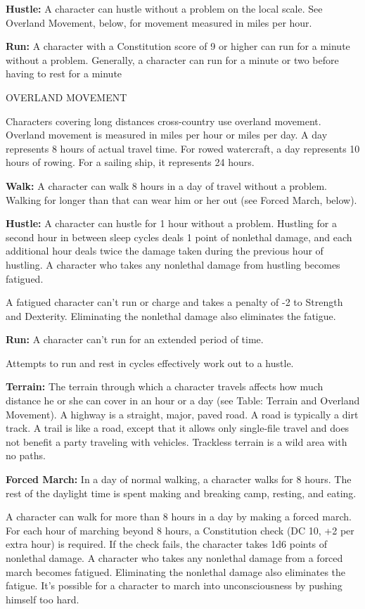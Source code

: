 \documentclass{article}
\begin{document}
\textbf{Hustle: }A character can hustle without a problem on the local scale. See 
Overland Movement, below, for movement measured in miles per hour.

\textbf{Run:} A character with a Constitution score of 9 or higher can run for 
a minute without a problem. Generally, a character can run for a minute or two 
before having to rest for a minute

\vspace{12pt}
OVERLAND MOVEMENT

Characters covering long distances cross-country use overland movement. Overland 
movement is measured in miles per hour or miles per day. A day represents 8 hours 
of actual travel time. For rowed watercraft, a day represents 10 hours of rowing. 
For a sailing ship, it represents 24 hours.

\textbf{Walk:} A character can walk 8 hours in a day of travel without a problem. 
Walking for longer than that can wear him or her out (see Forced March, below).

\textbf{Hustle:} A character can hustle for 1 hour without a problem. Hustling 
for a second hour in between sleep cycles deals 1 point of nonlethal damage, and 
each additional hour deals twice the damage taken during the previous hour of hustling. 
A character who takes any nonlethal damage from hustling becomes fatigued.

A fatigued character can't run or charge and takes a penalty of -2 to Strength 
and Dexterity. Eliminating the nonlethal damage also eliminates the fatigue.

\textbf{Run:} A character can't run for an extended period of time.

Attempts to run and rest in cycles effectively work out to a hustle.

\textbf{Terrain:} The terrain through which a character travels affects how much 
distance he or she can cover in an hour or a day (see Table: Terrain and Overland 
Movement). A highway is a straight, major, paved road. A road is typically a dirt 
track. A trail is like a road, except that it allows only single-file travel and 
does not benefit a party traveling with vehicles. Trackless terrain is a wild area 
with no paths.

\textbf{Forced March:} In a day of normal walking, a character walks for 8 hours. 
The rest of the daylight time is spent making and breaking camp, resting, and eating.

A character can walk for more than 8 hours in a day by making a forced march. For 
each hour of marching beyond 8 hours, a Constitution check (DC 10, +2 per extra 
hour) is required. If the check fails, the character takes 1d6 points of nonlethal 
damage. A character who takes any nonlethal damage from a forced march becomes 
fatigued. Eliminating the nonlethal damage also eliminates the fatigue. It's possible 
for a character to march into unconsciousness by pushing himself too hard.
\end{document}
